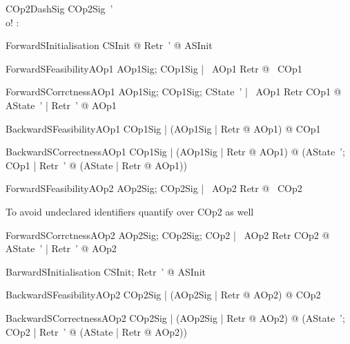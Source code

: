 \begin{schema}{COp2DashSig}
   COp2Sig~' \\
   o! : \nat
\end{schema}

\begin{theorem}{ForwardSInitialisation} 
   \forall CSInit @ \exists Retr~' @ ASInit
\end{theorem}

\begin{theorem}{ForwardSFeasibilityAOp1} 
   \forall AOp1Sig; COp1Sig | \pre~AOp1 \land Retr @ \pre~COp1
\end{theorem}

\begin{theorem}{ForwardSCorrctnessAOp1} 
   \forall AOp1Sig; COp1Sig; CState~' | \pre~AOp1 \land Retr \land COp1 @ 
   	\exists AState~' | Retr~' @ AOp1
\end{theorem}

\begin{theorem}{BackwardSFeasibilityAOp1} 
   \forall COp1Sig | (\forall AOp1Sig | Retr @ \pre AOp1) @ \pre COp1
\end{theorem}

\begin{theorem}{BackwardSCorrectnessAOp1} 
  \forall COp1Sig | (\forall AOp1Sig | Retr @ \pre AOp1) @ 
   	(\forall AState~'; COp1 | Retr~' @ (\exists AState | Retr @ AOp1))
\end{theorem}


\begin{theorem}{ForwardSFeasibilityAOp2} 
   \forall AOp2Sig; COp2Sig | \pre~AOp2 \land Retr @ \pre~COp2
\end{theorem}

To avoid undeclared identifiers quantify over COp2 as well
\begin{theorem}{ForwardSCorrctnessAOp2} 
  \forall AOp2Sig; COp2Sig; COp2 | \pre~AOp2 \land Retr \land COp2 @ 
   	\exists AState~' | Retr~' @ AOp2
\end{theorem}

\begin{theorem}{BarwardSInitialisation} 
   \forall CSInit; Retr~' @ ASInit 
\end{theorem}

\begin{theorem}{BackwardSFeasibilityAOp2} 
   \forall COp2Sig | (\forall AOp2Sig | Retr @ \pre AOp2) @ \pre COp2
\end{theorem}

\begin{theorem}{BackwardSCorrectnessAOp2} 
  \forall COp2Sig | (\forall AOp2Sig | Retr @ \pre AOp2) @ 
   	(\forall AState~'; COp2 | Retr~' @ (\exists AState | Retr @ AOp2))
\end{theorem}